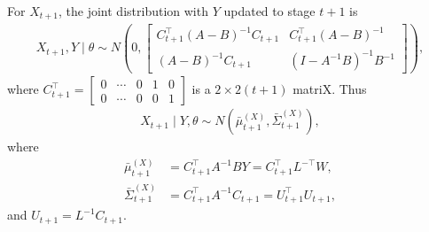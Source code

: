 For $X_{t+1}$, the joint distribution with $Y$ updated to stage $t+1$ is 
\begin{align*}
X_{t+1}, Y\mid \theta \sim N\left( 0, \begin{bmatrix}
C_{t+1}^\top\left(A-B\right) ^{-1}C_{t+1} & C_{t+1}^\top \left(A-B\right)^{-1}\\
\left(A-B\right)^{-1}C_{t+1} & \left(I- A^{-1}B\right) ^{-1}B^{-1}
\end{bmatrix} \right),
\end{align*}
where $C_{t+1}^\top = \begin{bmatrix}
0 & \cdots & 0 & 1 & 0 \\
0 & \cdots & 0 & 0 & 1
\end{bmatrix}$ is a $2 \times 2\left(t+1\right)$ matriX. Thus
\begin{align*}
X_{t+1}\mid Y,\theta \sim N\left( \bar{\mu}_{t+1}^{\left(X\right)},\bar{\Sigma}_{t+1}^{\left(X\right)} \right),
\end{align*}
where
\begin{align*}
\bar{\mu}_{t+1}^{\left(X\right)} & = C_{t+1}^\top A^{-1}BY =C_{t+1}^\top L^{-\top}W,\\
\bar{\Sigma}_{t+1}^{\left(X\right)} & =C_{t+1}^\top A^{-1}C_{t+1} =U_{t+1}^\top U_{t+1},
\end{align*}
and $U_{t+1} = L^{-1} C_{t+1}$. %

